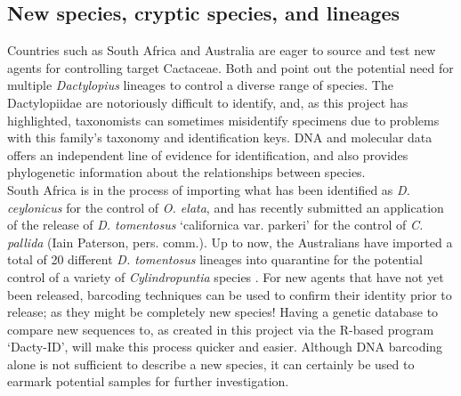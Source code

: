 \subsection{New species, cryptic species, and lineages}
Countries such as South Africa and Australia are eager to source and test new agents for controlling target Cactaceae. Both \citet{Paterson2011BiologicalAfrica} and  \citet{jones2016host} point out the potential need for multiple \textit{Dactylopius} lineages to control a diverse range of species. The Dactylopiidae are notoriously difficult to identify, and, as this project has highlighted, taxonomists can sometimes misidentify specimens due to problems with this family's taxonomy and identification keys. DNA and molecular data offers an independent line of evidence for identification, and also provides phylogenetic information about the relationships between species. \\
South Africa is in the process of importing what has been identified as \textit{D. ceylonicus} for the control of \textit{O. elata}, and has recently submitted an application of the release of \textit{
D. tomentosus} `californica var. parkeri' for the control of \textit{C. pallida} (Iain Paterson, pers. comm.). Up to now, the Australians have imported a total of 20 different \textit{D. tomentosus} lineages into quarantine for the potential control of a variety of \textit{Cylindropuntia} species \citep{isbcw2018Jones}. For new agents that have not yet been released, barcoding techniques can be used to confirm their identity prior to release; as they might be completely new species! Having a genetic database to compare new sequences to, as created in this project via the R-based program `Dacty-ID', will make this process quicker and easier. Although DNA barcoding alone is not sufficient to describe a new species, it can certainly be used to earmark potential samples for further investigation.

